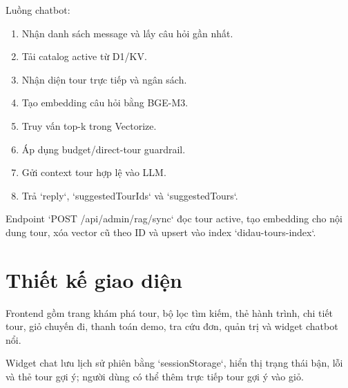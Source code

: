 Luồng chatbot:
\begin{enumerate}
    \item Nhận danh sách message và lấy câu hỏi gần nhất.
    \item Tải catalog active từ D1/KV.
    \item Nhận diện tour trực tiếp và ngân sách.
    \item Tạo embedding câu hỏi bằng BGE-M3.
    \item Truy vấn top-k trong Vectorize.
    \item Áp dụng budget/direct-tour guardrail.
    \item Gửi context tour hợp lệ vào LLM.
    \item Trả `reply`, `suggestedTourIds` và `suggestedTours`.
\end{enumerate}

Endpoint `POST /api/admin/rag/sync` đọc tour active, tạo embedding cho nội dung tour, xóa vector cũ theo ID và upsert vào index `didau-tours-index`.

\section{Thiết kế giao diện}
Frontend gồm trang khám phá tour, bộ lọc tìm kiếm, thẻ hành trình, chi tiết tour, giỏ chuyến đi, thanh toán demo, tra cứu đơn, quản trị và widget chatbot nổi.

Widget chat lưu lịch sử phiên bằng `sessionStorage`, hiển thị trạng thái bận, lỗi và thẻ tour gợi ý; người dùng có thể thêm trực tiếp tour gợi ý vào giỏ.
